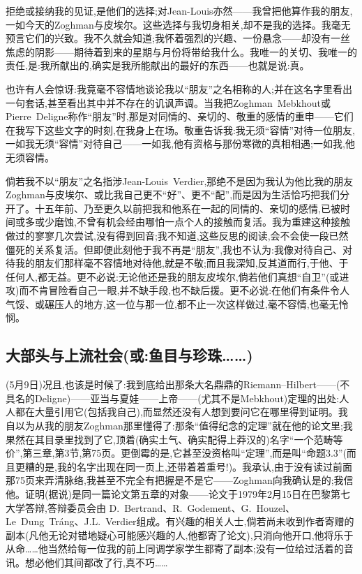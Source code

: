 拒绝或接纳我的见证,是他们的选择;对Jean-Louis亦然——我曾把他算作我的朋友,一如今天的Zoghman与皮埃尔。这些选择与我切身相关,却不是我的选择。我毫无预言它们的兴致。我不久就会知道;我怀着强烈的兴趣、一份悬念——却没有一丝焦虑的阴影——期待着到来的星期与月份将带给我什么。我唯一的关切、我唯一的责任,是:我所献出的,确实是我所能献出的最好的东西——也就是说:真。

也许有人会惊讶:我竟毫不容情地谈论我以“朋友”之名相称的人;并在这名字里看出一句套话,甚至看出其中并不存在的讥讽声调。当我把Zoghman~Mebkhout或Pierre~Deligne称作“朋友”时,那是对同情的、亲切的、敬重的感情的重申——它们在我写下这些文字的时刻,在我身上在场。敬重告诉我:我无须“容情”对待一位朋友,一如我无须“容情”对待自己——一如我,他有资格与那份寒微的真相相遇;一如我,他无须容情。

倘若我不以“朋友”之名指涉Jean-Louis~Verdier,那绝不是因为我认为他比我的朋友Zoghman与皮埃尔、或比我自己更不“好”、更不“配”,而是因为生活恰巧把我们分开了。十五年前、乃至更久以前把我和他系在一起的同情的、亲切的感情,已被时间或多或少磨蚀,不曾有机会经由哪怕一点个人的接触而复活。我为重建这种接触做过的寥寥几次尝试,没有得到回音;我不知道,这些反思的阅读,会不会使一段已然僵死的关系复活。但即便此刻他于我不再是“朋友”,我也不认为:我像对待自己、对待我的朋友们那样毫不容情地对待他,就是不敬;而且我深知,反其道而行,于他、于任何人,都无益。更不必说:无论他还是我的朋友皮埃尔,倘若他们真想“自卫”(或进攻)而不肯冒险看自己一眼,并不缺手段,也不缺后援。更不必说:在他们有条件\dmark{}令人气馁、或碾压人的地方,这一位与那一位,都不止一次这样做过,毫不容情,也毫无怜悯。

\subsection{大部头与上流社会(或:鱼目与珍珠……)}


(5月9日)况且,也该是时候了:我到底给出那条大名鼎鼎的Riemann--Hilbert——(不具名的Deligne)——亚当与夏娃——上帝——(尤其不是Mebkhout)定理的出处:人人都在大量引用它(包括我自己),而显然还没有人想到要问它在哪里得到证明。我自以为从我的朋友Zoghman那里懂得了:那条“值得纪念的定理”就在他的论文里;我果然在其目录里找到了它,顶着(确实土气、确实配得上莽汉的)名字“一个范畴等价”,第三章,第3节,第75页。更倒霉的是,它甚至没资格叫“定理”,而是叫“命题3.3”(而且更糟的是,我的名字出现在同一页上,还带着着重号!)。我承认,由于没有读过前面那75页来弄清脉络,我甚至不完全有把握是不是它——Zoghman向我确认是的;我信他。证明(据说)是同一篇论文第五章的对象——论文于1979年2月15日在巴黎第七大学答辩,答辩委员会由 D.~Bertrand、R.~Godement、G.~Houzel、Le~Dung~Tráng、J.L.~Verdier组成。有兴趣的相关人士,倘若尚未收到作者寄赠的副本(凡他无论对错地疑心可能感兴趣的人,他都寄了论文),只消向他开口,他将乐于从命……他当然给每一位我的前上同调学家学生都寄了副本;没有一位给过活着的音讯。想必他们其间都改了行,真不巧……

